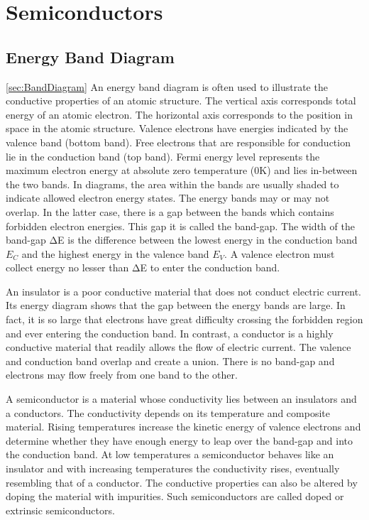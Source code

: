 \section{Semiconductors}


\subsection{Energy Band Diagram}
\ref{sec:BandDiagram}
An energy band diagram is often used to illustrate the conductive properties of an atomic structure. The vertical axis corresponds total energy of an atomic electron. The horizontal axis corresponds to the position in space in the atomic structure. Valence electrons have energies indicated by the valence band (bottom band). Free electrons that are responsible for conduction lie in the conduction band (top band). Fermi energy level represents the maximum electron energy at absolute zero temperature (0K) and lies in-between the two bands. In diagrams, the area within the bands are usually shaded to indicate allowed electron energy states. The energy bands may or may not overlap. In the latter case, there is a gap between the bands which contains forbidden electron energies. This gap it is called the band-gap. The width of the band-gap ΔE is the difference between the lowest energy in the conduction band $E_C$ and the highest energy in the valence band $E_V$. A valence electron must collect energy no lesser than ΔE to enter the conduction band.

An insulator is a poor conductive material that does not conduct electric current. Its energy diagram shows that the gap between the energy bands are large. In fact, it is so large that electrons have great difficulty crossing the forbidden region and ever entering the conduction band.
In contrast, a conductor is a highly conductive material that readily allows the flow of electric current. The valence and conduction band overlap and create a union. There is no band-gap and electrons may flow freely from one band to the other.

A semiconductor is a material whose conductivity lies between an insulators and a conductors. The conductivity depends on its temperature and composite material. Rising temperatures increase the kinetic energy of valence electrons and determine whether they have enough energy to leap over the band-gap and into the conduction band. At low temperatures a semiconductor behaves like an insulator and with increasing temperatures the conductivity rises, eventually resembling that of a conductor. The conductive properties can also be altered by doping the material with impurities. Such semiconductors are called doped or extrinsic semiconductors.


